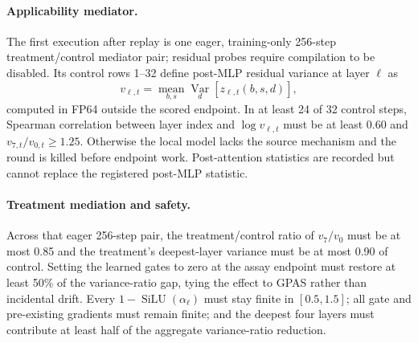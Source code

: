 \documentclass{article}
\newcommand{\silu}{\operatorname{SiLU}}
\begin{document}
\paragraph{Applicability mediator.}
The first execution after replay is one eager, training-only 256-step
treatment/control mediator pair; residual probes require compilation to be
disabled.  Its control rows 1--32 define post-MLP residual variance at layer
$\ell$ as
\[
v_{\ell,t} =
\operatorname*{mean}_{b,s}
\operatorname*{Var}_{d}\!\left[z_{\ell,t}(b,s,d)\right],
\]
computed in FP64 outside the scored endpoint.  In at least 24 of 32 control
steps, Spearman correlation between layer index and $\log v_{\ell,t}$ must be
at least 0.60 and $v_{7,t}/v_{0,t}\ge1.25$.  Otherwise the local model lacks
the source mechanism and the round is killed before endpoint work.
Post-attention statistics are recorded but cannot replace the registered
post-MLP statistic.

\paragraph{Treatment mediation and safety.}
Across that eager 256-step pair, the treatment/control ratio of
$v_7/v_0$ must be at most 0.85 and the treatment's deepest-layer variance
must be at most 0.90 of control.  Setting the learned gates to zero at the
assay endpoint must restore at least 50\% of the variance-ratio gap, tying the
effect to GPAS rather than incidental drift.  Every
$1-\silu(\alpha_\ell)$ must stay finite in $[0.5,1.5]$; all gate and
pre-existing gradients must remain finite; and the deepest four layers must
contribute at least half of the aggregate variance-ratio reduction.
\end{document}
